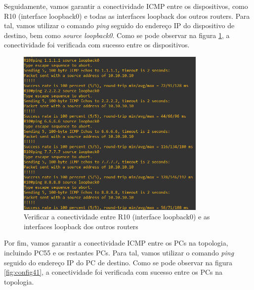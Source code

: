\documentclass[11pt,english, openright, oneside]{book}
\begin{document}
\newpage
\par Seguidamente, vamos garantir a conectividade ICMP entre os dispositivos, como R10 (interface loopback0) e todas as interfaces loopback dos outros routers. Para tal, vamos utilizar o comando \textit{ping} seguido do endereço IP do dispositivo de destino, bem como \textit{source loopback0}. Como se pode observar na figura \ref{fig:config40}, a conectividade foi verificada com sucesso entre os dispositivos.
\vspace{0.2cm}

\begin{figure}[H]
  \centering
  \includegraphics[width=0.82\textwidth]{imagens/Tarefa4/23.ping_R10_loopback0.png}
  \caption{Verificar a conectividade entre R10 (interface loopback0) e as interfaces loopback dos outros routers}
  \label{fig:config40}
\end{figure}
\vspace{0.2cm}

\newpage
\par Por fim, vamos garantir a conectividade ICMP entre os PCs na topologia, incluindo PC55 e os restantes PCs. Para tal, vamos utilizar o comando \textit{ping} seguido do endereço IP do PC de destino. Como se pode observar na figura \ref{fig:config41}, a conectividade foi verificada com sucesso entre os PCs na topologia.
\vspace{0.2cm}
\end{document}
